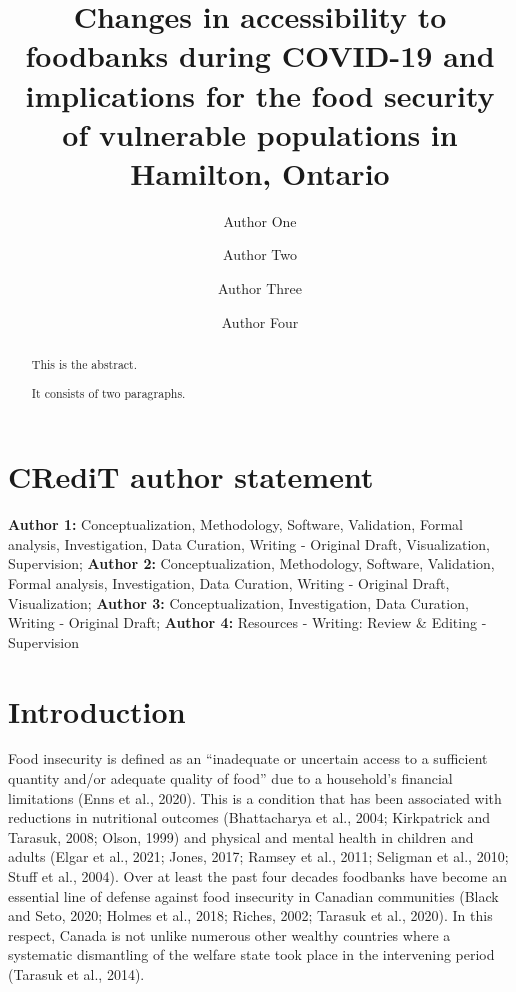 \documentclass[]{elsarticle} %
\begin{document}
\begin{frontmatter}

  \title{Changes in accessibility to foodbanks during COVID-19 and
implications for the food security of vulnerable populations in
Hamilton, Ontario}
    \author[Some University]{Author One}
    \author[]{Author Two}
    \author[Some University]{Author Three}
    \author[Another University]{Author Four}
      \address[Some University]{Department, Street, City, State, Zip}
    \address[Another University]{Department, Street, City, State, Zip}
  
  \begin{abstract}
  This is the abstract.

  It consists of two paragraphs.
  \end{abstract}
  
 \end{frontmatter}

\hypertarget{credit-author-statement}{%
\section{CRediT author statement}\label{credit-author-statement}}

\textbf{Author 1:} Conceptualization, Methodology, Software, Validation,
Formal analysis, Investigation, Data Curation, Writing - Original Draft,
Visualization, Supervision; \textbf{Author 2:} Conceptualization,
Methodology, Software, Validation, Formal analysis, Investigation, Data
Curation, Writing - Original Draft, Visualization; \textbf{Author 3:}
Conceptualization, Investigation, Data Curation, Writing - Original
Draft; \textbf{Author 4:} Resources - Writing: Review \& Editing -
Supervision

\newpage

\hypertarget{introduction}{%
\section{Introduction}\label{introduction}}

Food insecurity is defined as an ``inadequate or uncertain access to a
sufficient quantity and/or adequate quality of food'' due to a
household's financial limitations (Enns et al., 2020). This is a
condition that has been associated with reductions in nutritional
outcomes (Bhattacharya et al., 2004; Kirkpatrick and Tarasuk, 2008;
Olson, 1999) and physical and mental health in children and adults
(Elgar et al., 2021; Jones, 2017; Ramsey et al., 2011; Seligman et al.,
2010; Stuff et al., 2004). Over at least the past four decades foodbanks
have become an essential line of defense against food insecurity in
Canadian communities (Black and Seto, 2020; Holmes et al., 2018; Riches,
2002; Tarasuk et al., 2020). In this respect, Canada is not unlike
numerous other wealthy countries where a systematic dismantling of the
welfare state took place in the intervening period (Tarasuk et al.,
2014).
\end{document}
